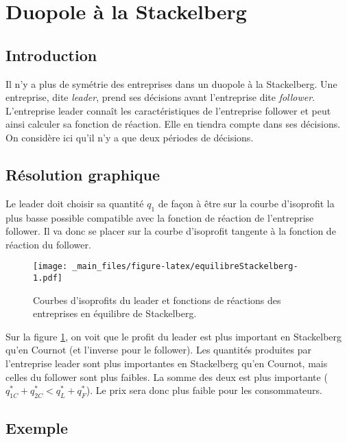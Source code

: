 \documentclass[
  a4paper,
]{book}
\theoremstyle{definition}
\theoremstyle{definition}
\theoremstyle{definition}
\theoremstyle{definition}
\theoremstyle{remark}
\begin{document}
\hypertarget{duopole-uxe0-la-stackelberg}{%
\section{Duopole à la Stackelberg}\label{duopole-uxe0-la-stackelberg}}

\hypertarget{introduction-1}{%
\subsection{Introduction}\label{introduction-1}}

Il n'y a plus de symétrie des entreprises dans un duopole à la Stackelberg.
Une entreprise, dite \emph{leader}, prend ses décisions avant l'entreprise dite \emph{follower}.
L'entreprise leader connaît les caractéristiques de l'entreprise follower et peut ainsi calculer sa fonction de réaction.
Elle en tiendra compte dans ses décisions.
On considère ici qu'il n'y a que deux périodes de décisions.

\hypertarget{ruxe9solution-graphique}{%
\subsection{Résolution graphique}\label{ruxe9solution-graphique}}

Le leader doit choisir sa quantité \(q_1\) de façon à être sur la courbe d'isoprofit la plus basse possible compatible avec la fonction de réaction de l'entreprise follower.
Il va donc se placer sur la courbe d'isoprofit tangente à la fonction de réaction du follower.

\begin{figure}
\centering
\texttt{[image: \_main\_files/figure-latex/equilibreStackelberg-1.pdf]}
\caption{\label{fig:equilibreStackelberg}Courbes d'isoprofits du leader et fonctions de réactions des entreprises en équilibre de Stackelberg.}
\end{figure}

Sur la figure \ref{fig:equilibreStackelberg}, on voit que le profit du leader est plus important en Stackelberg qu'en Cournot (et l'inverse pour le follower).
Les quantités produites par l'entreprise leader sont plus importantes en Stackelberg qu'en Cournot, mais celles du follower sont plus faibles.
La somme des deux est plus importante (\(q_{1C}^*+q_{2C}^*<q_{L}^*+q_{F}^*\)).
Le prix sera donc plus faible pour les consommateurs.

\hypertarget{exemple-1}{%
\subsection{Exemple}\label{exemple-1}}
\end{document}
